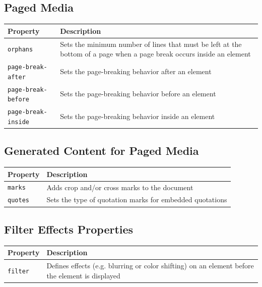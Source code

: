 \documentclass[11pt, letterpaper]{article}
\begin{document}
		\subsection{Paged Media}
			\begin{longtable}{p{5cm} p{10cm}}
				\toprule
				Property & Description \\\midrule 
				\texttt{orphans} & Sets the minimum number of lines that must be left at the bottom of a page when a page break occurs inside an element \\\midrule
				\texttt{page-break-after} & Sets the page-breaking behavior after an element \\\midrule
				\texttt{page-break-before} & Sets the page-breaking behavior before an element \\\midrule
				\texttt{page-break-inside} & Sets the page-breaking behavior inside an element \\\midrule
			\end{longtable}

		\subsection{Generated Content for Paged Media}
			\begin{longtable}{p{5cm} p{10cm}}
				\toprule
				Property & Description \\\midrule 
				\texttt{marks} & Adds crop and/or cross marks to the document \\\midrule
				\texttt{quotes} & Sets the type of quotation marks for embedded quotations \\\midrule
			\end{longtable}

		\subsection{Filter Effects Properties}
			\begin{longtable}{p{5cm} p{10cm}}
				\toprule
				Property & Description \\\midrule 
				\texttt{filter} & Defines effects (e.g. blurring or color shifting) on an element before the element is displayed \\\midrule
			\end{longtable}
\end{document}
